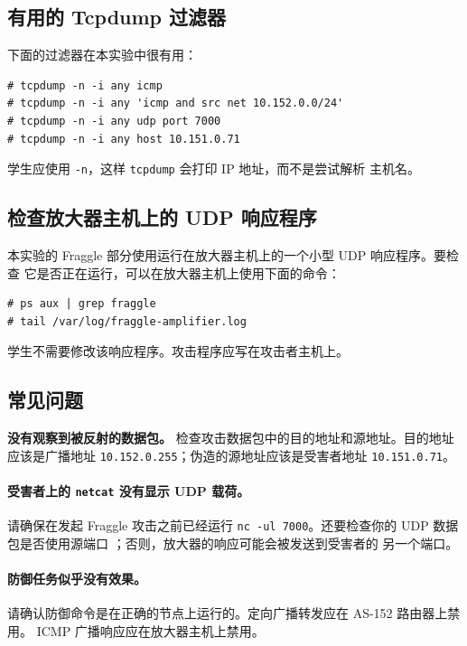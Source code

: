 \subsection{有用的 Tcpdump 过滤器}

下面的过滤器在本实验中很有用：

\begin{lstlisting}
# tcpdump -n -i any icmp
# tcpdump -n -i any 'icmp and src net 10.152.0.0/24'
# tcpdump -n -i any udp port 7000
# tcpdump -n -i any host 10.151.0.71
\end{lstlisting}

学生应使用 \texttt{-n}，这样 \texttt{tcpdump} 会打印 IP 地址，而不是尝试解析
主机名。


\subsection{检查放大器主机上的 UDP 响应程序}

本实验的 Fraggle 部分使用运行在放大器主机上的一个小型 UDP 响应程序。要检查
它是否正在运行，可以在放大器主机上使用下面的命令：

\begin{lstlisting}
# ps aux | grep fraggle
# tail /var/log/fraggle-amplifier.log
\end{lstlisting}

学生不需要修改该响应程序。攻击程序应写在攻击者主机上。


\subsection{常见问题}

\noindent\textbf{没有观察到被反射的数据包。}
检查攻击数据包中的目的地址和源地址。目的地址应该是广播地址
\texttt{10.152.0.255}；伪造的源地址应该是受害者地址
\texttt{10.151.0.71}。

\paragraph{受害者上的 \texttt{netcat} 没有显示 UDP 载荷。}
请确保在发起 Fraggle 攻击之前已经运行 \texttt{nc -ul 7000}。还要检查你的 UDP
数据包是否使用源端口 \fraggleport；否则，放大器的响应可能会被发送到受害者的
另一个端口。

\paragraph{防御任务似乎没有效果。}
请确认防御命令是在正确的节点上运行的。定向广播转发应在 AS-152 路由器上禁用。
ICMP 广播响应应在放大器主机上禁用。


